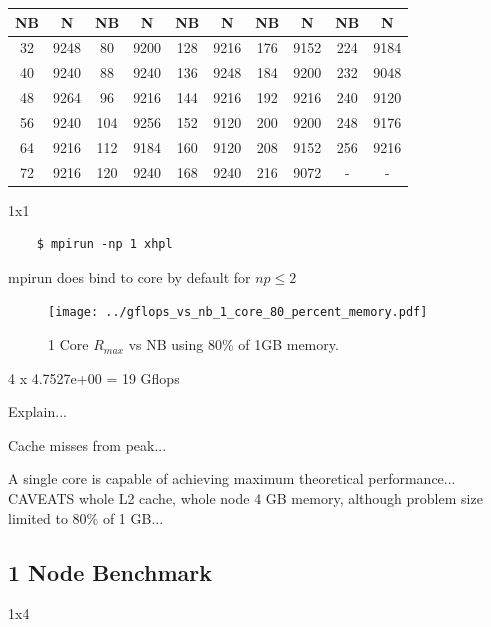 \documentclass{article}
\begin{document}
\begin{center}
	\begin{tabular}{ |c|c|c|c|c|c|c|c|c|c| } 
		\hline
		NB & N & NB & N & NB & N & NB & N & NB & N \\ 
		\hline
		32 & 9248 &  80 & 9200 & 128 & 9216 & 176 & 9152 & 224 & 9184 \\ 
		40 & 9240 &  88 & 9240 & 136 & 9248 & 184 & 9200 & 232 & 9048 \\ 
 		48 & 9264 &  96 & 9216 & 144 & 9216 & 192 & 9216 & 240 & 9120 \\
		56 & 9240 & 104 & 9256 & 152 & 9120 & 200 & 9200 & 248 & 9176 \\ 
 		64 & 9216 & 112 & 9184 & 160 & 9120 & 208 & 9152 & 256 & 9216 \\
		72 & 9216 & 120 & 9240 & 168 & 9240 & 216 & 9072 &   - &    - \\ 
 		\hline
	\end{tabular}
\end{center}

1x1

\begin{verbatim}
    $ mpirun -np 1 xhpl
\end{verbatim}

mpirun does bind to core by default for $np \leq 2$

\begin{figure}
	\centering	
	\texttt{[image: ../gflops\_vs\_nb\_1\_core\_80\_percent\_memory.pdf]}
	\caption{1 Core $R_{max}$ vs NB using 80\% of 1GB memory.}
\end{figure}

4 x 4.7527e+00 = 19 Gflops

Explain...

Cache misses from peak...

A single core is capable of achieving maximum theoretical performance... CAVEATS whole L2 cache, whole node 4 GB memory, although problem size limited to 80\% of 1 GB...  


\subsection{1 Node Benchmark}

1x4
\end{document}
